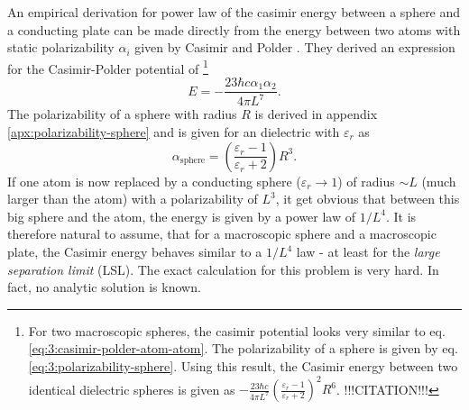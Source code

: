 An empirical derivation for power law of the casimir energy between a sphere and a conducting plate can be made directly from the energy between two atoms with static polarizability $\alpha_i$ given by Casimir and Polder \cite{Casimir_1948a}. They derived an expression for the Casimir-Polder potential of \footnote{For two macroscopic spheres, the casimir potential looks very similar to eq. \eqref{eq:3:casimir-polder-atom-atom}. The polarizability of a sphere is given by eq. \eqref{eq:3:polarizability-sphere}. Using this result, the Casimir energy between two identical dielectric spheres is given as $-\frac{23\hbar c}{4\pi L^7}\left(\frac{\varepsilon_r-1}{\varepsilon_r+2}\right)^2R^6$. !!!CITATION!!!}
\begin{equation}\label{eq:3:casimir-polder-atom-atom}
  E = -\frac{23\hbar c \alpha_1 \alpha_2}{4 \pi L^7} .
\end{equation}
The polarizability of a sphere with radius $R$ is derived in appendix \ref{apx:polarizability-sphere} and is given for an dielectric with $\varepsilon_r$ as 
\begin{equation} \label{eq:3:polarizability-sphere}
  \alpha_\mathrm{sphere} = \left(\frac{\varepsilon_r-1}{\varepsilon_r+2}\right)R^3 .
\end{equation}
If one atom is now replaced by a conducting sphere ($\varepsilon_r \rightarrow 1$) of radius $\sim L$ (much larger than the atom) with a polarizability of $L^3$, it get obvious that between this big sphere and the atom, the energy is given by a power law of $1/L^4$.
It is therefore natural to assume, that for a macroscopic sphere and a macroscopic plate, the Casimir energy behaves similar to a $1/L^4$ law - at least for the \textit{large separation limit} (LSL).
The exact calculation for this problem is very hard. In fact, no analytic solution is known.

